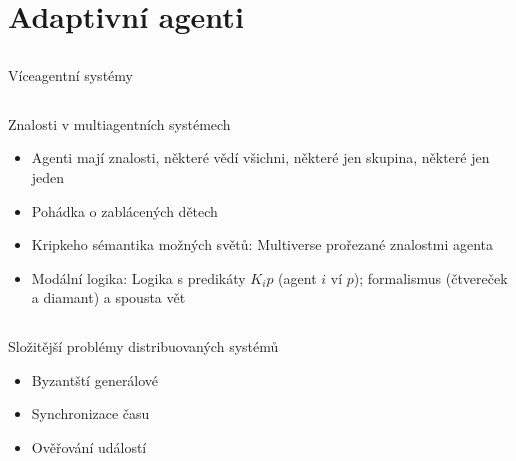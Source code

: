 \documentclass{beamer}
\begin{document}
\section{Adaptivní agenti}

\subsection{}
\begin{frame}{Víceagentní systémy}
\end{frame}

\subsection{}
\begin{frame}{Znalosti v multiagentních systémech}
\begin{itemize}
\item Agenti mají znalosti, některé vědí všichni, některé jen skupina, některé jen jeden
\item Pohádka o zablácených dětech
\item Kripkeho sémantika možných světů: Multiverse prořezané znalostmi agenta
\item Modální logika: Logika s predikáty $K_i p$ (agent $i$ ví $p$);
	formalismus (čtvereček a diamant) a spousta vět
\end{itemize}
\end{frame}

\subsection{}
\begin{frame}{Složitější problémy distribuovaných systémů}
\begin{itemize}
\item Byzantští generálové
\item Synchronizace času
\item Ověřování událostí
\end{itemize}
\end{frame}
\end{document}
